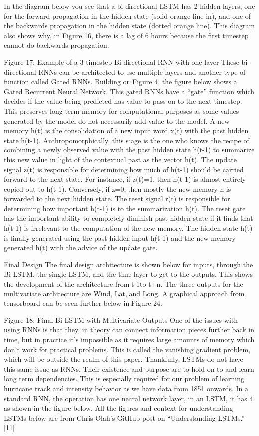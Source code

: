\documentclass{article}
\begin{document}
In the diagram below you see that a bi-directional LSTM has 2 hidden layers, one for the forward propagation in the hidden state (solid orange line in), and one of the backwards propagation in the hidden state (dotted orange line). This diagram also shows why, in Figure 16, there is a lag of 6 hours because the first timestep cannot do backwards propagation.

Figure 17: Example of a 3 timestep Bi-directional RNN with one layer
These bi-directional RNNs can be architected to use multiple layers and another type of function called Gated RNNs. Building on Figure 4, the figure below shows a Gated Recurrent Neural Network. This gated RNNs have a ``gate'' function which decides if the value being predicted has value to pass on to the next timestep. This preserves long term memory for computational purposes as some values generated by the model do not necessarily add value to the model. A new memory h(t) is the consolidation of a new input word x(t) with the past hidden state h(t-1). Anthropomorphically, this stage is the one who knows the recipe of combining a newly observed value with the past hidden state h(t-1) to summarize this new value in light of the contextual past as the vector h(t). The update signal z(t) is responsible for determining how much of h(t-1) should be carried forward to the next state. For instance, if z(t)=1, then h(t-1) is almost entirely copied out to h(t-1). Conversely, if z=0, then mostly the new memory h is forwarded to the next hidden state. The reset signal r(t) is responsible for determining how important h(t-1) is to the summarization h(t). The reset gate has the important ability to completely diminish past hidden state if it finds that h(t-1) is irrelevant to the computation of the new memory. The hidden state h(t) is finally generated using the past hidden input h(t-1) and the new memory generated h(t) with the advice of the update gate.

Final Design
The final design architecture is shown below for inputs, through the Bi-LSTM, the single LSTM, and the time layer to get to the outputs. This shows the development of the architecture from t-1to t+n. The three outputs for the multivariate architecture are Wind, Lat, and Long. A graphical approach from tensorboard can be seen further below in Figure 24.

Figure 18: Final Bi-LSTM with Multivariate Outputs
One of the issues with using RNNs is that they, in theory can connect information pieces further back in time, but in practice it’s impossible as it requires large amounts of memory which don’t work for practical problems. This is called the vanishing gradient problem, which will be outside the realm of this paper. Thankfully, LSTMs do not have this same issue as RNNs. Their existence and purpose are to hold on to and learn long term dependencies. This is especially required for our problem of learning hurricane track and intensity behavior as we have data from 1851 onwards. In a standard RNN, the operation has one neural network layer, in an LSTM, it has 4 as shown in the figure below. All the figures and context for understanding LSTMs below are from Chris Olah’s GitHub post on ``Understanding LSTMs.''  [11] %
\end{document}
